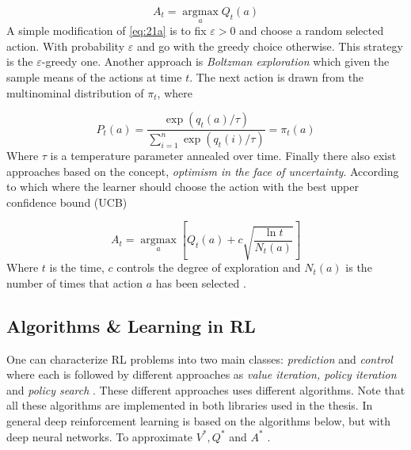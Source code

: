 \documentclass{kththesis}
\theoremstyle{definition}
\begin{document}
\begin{equation}
    \label{eq:21a}
    A_t = \underset{a}{\operatorname{argmax}}Q_t(a)
\end{equation}
A simple modification of \autoref{eq:21a} is to fix $\varepsilon > 0$ and choose a random selected action. With probability $\varepsilon$ and go with the greedy choice otherwise. This strategy is the $\varepsilon$-greedy one. Another approach is \textit{Boltzman exploration} \parencite{sutton1998reinforcement,szepesvari2009algorithms} which given the sample means of the actions at time $t$. The next action is drawn from the multinominal distribution of $\pi_t$, where 

\begin{equation}
    \label{eq:21b}
    P_t(a) = \frac{\exp{(q_{t}(a)/\tau)}}{ \sum_{i=1}^{n}{\exp{(q_{t}(i)/ \tau)}}} = \pi_t(a)
\end{equation}
Where $ \tau$ is a temperature parameter annealed over time.
Finally there also exist approaches based on the concept, \textit{optimism in the face of uncertainty}. According to which where the learner should choose the action with the best upper confidence bound (UCB) \parencite{sutton1998reinforcement, szepesvari2009algorithms}

\begin{equation}
    \label{eq:21c}
    A_t = \underset{a}{\operatorname{argmax}} \left[Q_t(a) + c \sqrt{\frac{\ln{t}}{N_t(a)}} \right]
\end{equation}
Where $t$ is the time, $c$ controls the degree of exploration and $N_t(a)$ is the number of times that action $a$ has been selected \parencite{sutton1998reinforcement}.

\subsection{Algorithms \& Learning in RL}
One can characterize RL problems into two main classes: \textit{prediction} and \textit{control} where each is followed by different approaches as \textit{value iteration, policy iteration} and \textit{policy search} \parencite{szepesvari2009algorithms}. These different approaches uses different algorithms. Note that all these algorithms are implemented in both \parencite{plappert2016kerasrl, baselines} libraries used in the thesis. In general deep reinforcement learning is based on the algorithms below, but with deep neural networks. To approximate $V^{*}, Q^{*}$ and $A^{*}$ \parencite{arulkumaran2017brief}. 

\end{document}
